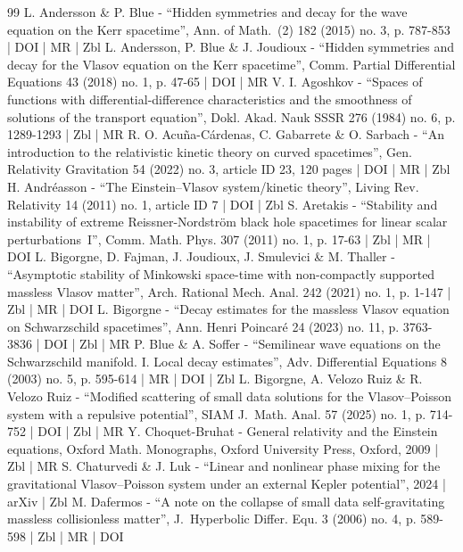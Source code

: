 \begin{thebibliography}{99}
L. Andersson \& P. Blue - “Hidden symmetries and decay for the wave equation on the Kerr spacetime”, Ann. of Math. (2) 182 (2015) no. 3, p. 787-853 | DOI | MR | Zbl
L. Andersson, P. Blue \& J. Joudioux - “Hidden symmetries and decay for the Vlasov equation on the Kerr spacetime”, Comm. Partial Differential Equations 43 (2018) no. 1, p. 47-65 | DOI | MR
V. I. Agoshkov - “Spaces of functions with differential-difference characteristics and the smoothness of solutions of the transport equation”, Dokl. Akad. Nauk SSSR 276 (1984) no. 6, p. 1289-1293 | Zbl | MR
R. O. Acuña-Cárdenas, C. Gabarrete \& O. Sarbach - “An introduction to the relativistic kinetic theory on curved spacetimes”, Gen. Relativity Gravitation 54 (2022) no. 3, article ID 23, 120 pages | DOI | MR | Zbl
H. Andréasson - “The Einstein–Vlasov system/kinetic theory”, Living Rev. Relativity 14 (2011) no. 1, article ID 7 | DOI | Zbl
S. Aretakis - “Stability and instability of extreme Reissner-Nordström black hole spacetimes for linear scalar perturbations I”, Comm. Math. Phys. 307 (2011) no. 1, p. 17-63 | Zbl | MR | DOI
L. Bigorgne, D. Fajman, J. Joudioux, J. Smulevici \& M. Thaller - “Asymptotic stability of Minkowski space-time with non-compactly supported massless Vlasov matter”, Arch. Rational Mech. Anal. 242 (2021) no. 1, p. 1-147 | Zbl | MR | DOI
L. Bigorgne - “Decay estimates for the massless Vlasov equation on Schwarzschild spacetimes”, Ann. Henri Poincaré 24 (2023) no. 11, p. 3763-3836 | DOI | Zbl | MR
P. Blue \& A. Soffer - “Semilinear wave equations on the Schwarzschild manifold. I. Local decay estimates”, Adv. Differential Equations 8 (2003) no. 5, p. 595-614 | MR | DOI | Zbl
L. Bigorgne, A. Velozo Ruiz \& R. Velozo Ruiz - “Modified scattering of small data solutions for the Vlasov–Poisson system with a repulsive potential”, SIAM J. Math. Anal. 57 (2025) no. 1, p. 714-752 | DOI | Zbl | MR
Y. Choquet-Bruhat - General relativity and the Einstein equations, Oxford Math. Monographs, Oxford University Press, Oxford, 2009 | Zbl | MR
S. Chaturvedi \& J. Luk - “Linear and nonlinear phase mixing for the gravitational Vlasov–Poisson system under an external Kepler potential”, 2024 | arXiv | Zbl
M. Dafermos - “A note on the collapse of small data self-gravitating massless collisionless matter”, J. Hyperbolic Differ. Equ. 3 (2006) no. 4, p. 589-598 | Zbl | MR | DOI

\end{thebibliography}
